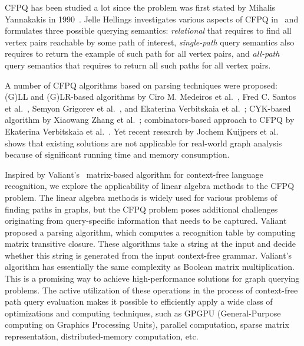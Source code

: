 \documentclass[sigconf, nonacm]{acmart}
\begin{document}
CFPQ has been studied a lot since the problem was first stated by Mihalis Yannakakis in 1990~\cite{Yannakakis}.
Jelle Hellings investigates various aspects of CFPQ in~\cite{hellingsPathQuerying,hellingsRelational,DBLP:journals/corr/Hellings15} and formulates three possible querying semantics: \textit{relational} that requires to find all vertex pairs reachable by some path of interest, \textit{single-path} query semantics also requires to return the example of such path for all vertex pairs, and \textit{all-path} query semantics that requires to return all such paths for all vertex pairs.

A number of CFPQ algorithms based on parsing techniques were proposed: (G)LL and (G)LR-based algorithms by Ciro M. Medeiros et al.~\cite{Medeiros:2018:EEC:3167132.3167265}, Fred C. Santos et al.~\cite{10.1007/978-3-319-91662-0_17}, Semyon Grigorev et al.~\cite{Grigorev:2017:CPQ:3166094.3166104}, and Ekaterina Verbitskaia et al.~\cite{10.1007/978-3-319-41579-6_22}; CYK-based algorithm by Xiaowang Zhang et al.~\cite{10.1007/978-3-319-46523-4_38}; combinators-based approach to CFPQ by Ekaterina Verbitskaia et al.~\cite{Verbitskaia:2018:PCC:3241653.3241655}.
Yet recent research by Jochem Kuijpers et al.~\cite{Kuijpers:2019:ESC:3335783.3335791} shows that existing solutions are not applicable for real-world graph analysis because of significant
running time and memory consumption.

Inspired by Valiant's~\cite{valiant} matrix-based algorithm for context-free language recognition, we explore the applicability of linear algebra methods to the CFPQ problem. The linear algebra methods is widely used for various problems of finding paths in graphs, but the CFPQ problem poses additional challenges originating from query-specific information that needs to be captured. Valiant proposed a parsing algorithm, which computes a recognition table by computing matrix transitive closure. These algorithms take a string
at the input and decide whether this string is generated from the
input context-free grammar. Valiant’s algorithm has essentially the same complexity as Boolean matrix multiplication. This is a promising way to achieve high-performance solutions for graph querying problems. The active utilization of these operations in the process of context-free path query evaluation
makes it possible to efficiently apply a wide class of optimizations
and computing techniques, such as GPGPU (General-Purpose computing on Graphics Processing Units), parallel computation, sparse
matrix representation, distributed-memory computation, etc.
\end{document}
